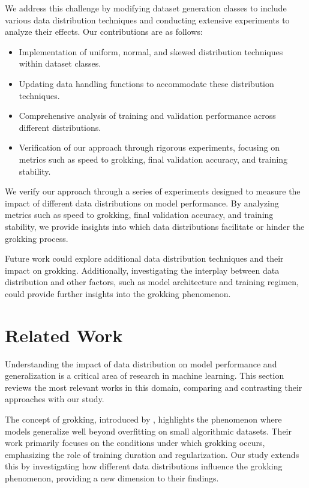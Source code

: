 \documentclass{article} %
\begin{document}
We address this challenge by modifying dataset generation classes to include various data distribution techniques and conducting extensive experiments to analyze their effects. Our contributions are as follows:
\begin{itemize}
    \item Implementation of uniform, normal, and skewed distribution techniques within dataset classes.
    \item Updating data handling functions to accommodate these distribution techniques.
    \item Comprehensive analysis of training and validation performance across different distributions.
    \item Verification of our approach through rigorous experiments, focusing on metrics such as speed to grokking, final validation accuracy, and training stability.
\end{itemize}

We verify our approach through a series of experiments designed to measure the impact of different data distributions on model performance. By analyzing metrics such as speed to grokking, final validation accuracy, and training stability, we provide insights into which data distributions facilitate or hinder the grokking process.

Future work could explore additional data distribution techniques and their impact on grokking. Additionally, investigating the interplay between data distribution and other factors, such as model architecture and training regimen, could provide further insights into the grokking phenomenon.

\section{Related Work}
\label{sec:related}

Understanding the impact of data distribution on model performance and generalization is a critical area of research in machine learning. This section reviews the most relevant works in this domain, comparing and contrasting their approaches with our study.

The concept of grokking, introduced by \citet{power2022grokking}, highlights the phenomenon where models generalize well beyond overfitting on small algorithmic datasets. Their work primarily focuses on the conditions under which grokking occurs, emphasizing the role of training duration and regularization. Our study extends this by investigating how different data distributions influence the grokking phenomenon, providing a new dimension to their findings.
\end{document}
